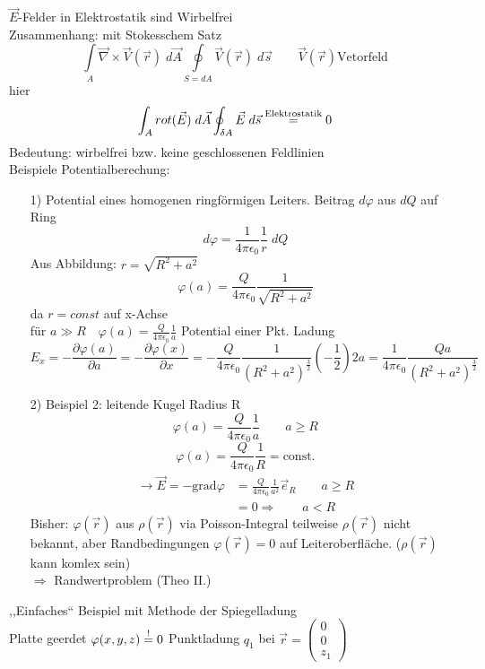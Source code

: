 \documentclass[titlepage,12pt,a4paper,ngerman]{report}
\newcommand{\tx}[1]{\textrm{#1}}
\newcommand{\grad}{\tx{grad}}
\begin{document}
$\vec{E}$-Felder in Elektrostatik sind Wirbelfrei\\
Zusammenhang: mit Stokesschem Satz
$$\int\limits_{A} \vec{\nabla} \times \vec{V}(\vec{r}) \; d\vec{A} \oint\limits _{S= dA} \vec{V}(\vec{r}) \; d \vec{s} \qquad \vec{V}(\vec{r}) \textrm{Vetorfeld}$$
hier
$$\int_{A} rot(\vec{E}) \; d\vec{A} \oint_{\delta A} \vec{E} \; d\vec{s} \buildrel \textrm{Elektrostatik}\over= 0 $$
Bedeutung: wirbelfrei bzw. keine geschlossenen Feldlinien\\
Beispiele Potentialberechung:
\begin{itemize}
\item[1)] Potential eines homogenen ringförmigen Leiters. Beitrag $d\varphi$ aus $dQ$ auf Ring
$$ d\varphi = \frac{1}{4\pi\epsilon_0} \frac{1}{r} \;dQ$$
Aus Abbildung: $r = \sqrt{R^2 + a^2}$
$$ \varphi(a) = \frac{Q}{4\pi\epsilon_0} \frac{1}{\sqrt{R^2 + a^2}}$$
da $r = const$ auf x-Achse\\
für $a\gg R \quad \varphi(a) = \frac{Q}{4\pi\epsilon_0} \frac{1}{a}$ Potential einer Pkt. Ladung
$$E_x = -\frac{\partial \varphi(a)}{\partial a}= -\frac{\partial\varphi(x)}{\partial x} = -\frac{Q}{4\pi\epsilon_0} \frac{1}{(R^2 + a^2)^{\frac{3}{2}}} (-\frac{1}{2}) 2 a = \frac{1}{4\pi\epsilon_0} \frac{Q a}{(R^2 + a^2)^{\frac{3}{2}}}$$
\item[2)] Beispiel 2: leitende Kugel Radius R
$$\varphi(a) = \frac{Q}{4\pi\epsilon_0} \frac{1}{a} \qquad a\ge R$$
$$ \varphi(a) = \frac{Q}{4\pi\epsilon_0} \frac{1}{R} = \tx{const.}$$
\begin{align*}
\rightarrow \vec{E} = - \grad \varphi &= \frac{Q}{4\pi\epsilon_0} \frac{1}{a^2} \vec{e}_R \qquad a\ge R \\
 &= 0 \Rightarrow \qquad a < R
\end{align*}
Bisher: $\varphi(\vec{r})$ aus $\rho(\vec{r})$ via Poisson-Integral teilweise $\rho(\vec{r})$ nicht bekannt, aber Randbedingungen $\varphi(\vec{r}) = 0 $ auf Leiteroberfläche. ($\rho(\vec{r})$ kann komlex sein)\\
$\Rightarrow$ Randwertproblem (Theo II.)\\

\end{itemize}

,,Einfaches`` Beispiel mit Methode der Spiegelladung\\
Platte geerdet $\varphi(x,y,z) \buildrel ! \over = 0$
Punktladung $q_1$ bei $\vec{r} = \begin{pmatrix}
0\\
0\\
z_1
\end{pmatrix}$
\end{document}

